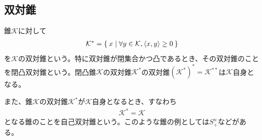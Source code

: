 \subsection{双対錐}
錐$\mathcal{K}$に対して
\begin{align*}
  \mathcal{K}^* = \Set{x | \forall y \in \mathcal{K}, \dot<x, y> \geq 0}
\end{align*}
を$\mathcal{K}$の双対錐という。特に双対錐が閉集合かつ凸であるとき、その双対錐のことを閉凸双対錐という。閉凸錐$\mathcal{K}$の双対錐$\mathcal{K}^*$の双対錐$\left(\mathcal{K}^*\right)^* = \mathcal{K}^{**}$は$\mathcal{K}$自身となる\cite*{ConvexOptimization}。

また、錐$\mathcal{K}$の双対錐$\mathcal{K}^*$が$\mathcal{K}$自身となるとき、すなわち
\begin{align*}
  \mathcal{K}^* = \mathcal{K}
\end{align*}
となる錐のことを自己双対錐という。このような錐の例としては$S_+^n$などがある。
